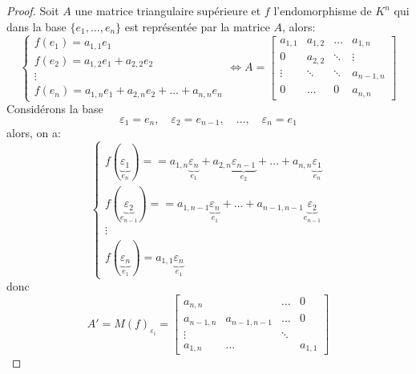 \begin{proof}
    Soit $A$ une matrice triangulaire supérieure et  $f$ l'endomorphisme de  $K^n$ qui dans la base $\{e_1, \ldots, e_n\}$ est représentée par la matrice $A$, alors:
     \[
    \begin{cases}
        f(e_1) = a_{1, 1} e_1\\
        f(e_2) = a_{1, 2} e_1 + a_{2, 2}e_2\\
        \vdots \\
        f(e_n) = a_{1, n} e_1 + a_{2, n}e_2 + \ldots + a_{n, n}e_n
    \end{cases} 
    \iff
         A = 
         \begin{bmatrix} 
         a_{1,1} & a_{1,2} & \ldots & a_{1,n} \\
         0 & a_{2,2} & \ddots & \vdots\\
         \vdots & \ddots & \ddots & a_{n-1,n}\\
         0 & \ldots & 0 & a_{n,n}
        \end{bmatrix}
    \] 
    Considérons la base 
    \[
    \varepsilon_1 = e_n, \quad \varepsilon_2 = e_{n-1}, \quad \ldots, \quad \varepsilon_n = e_1
    \] 
    alors, on a:
    \[
    \begin{cases}
        f(\underbrace{\varepsilon_1}_{e_n}) = = a_{1, n}\underbrace{\varepsilon_n}_{e_1} + a_{2, n}\underbrace{\varepsilon_{n-1}}_{e_2} + \ldots + a_{n, n}\underbrace{\varepsilon_1}_{e_n} \\
        f(\underbrace{\varepsilon_2}_{e_{n-1}}) = = a_{1, n-1}\underbrace{\varepsilon_n}_{e_1} + \ldots + a_{n-1, n-1}\underbrace{\varepsilon_2}_{e_{n-1}} \\
        \vdots \\
        f(\underbrace{\varepsilon_n}_{e_1}) = a_{1,1}\underbrace{\varepsilon_n}_{e_1}
    \end{cases}
    \] 
    donc 
    \[
    A' = M(f)_{\varepsilon_{i}} = 
    \begin{bmatrix} 
        a_{n, n}   &              & \ldots & 0\\
        a_{n-1, n} & a_{n-1, n-1} & \ldots & 0\\
        \vdots     &              & \ddots & \\
        a_{1, n}   & \ldots       &        & a_{1,1}
    \end{bmatrix} 
    \] 
\end{proof}
